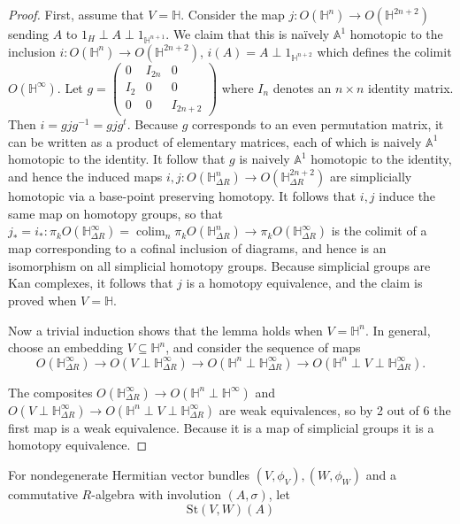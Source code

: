 \documentclass[edeposit,fullpage]{uiucthesis2009}
\newcommand{\mbb}{\mathbb}
\newcommand{\St}{\mathrm{St}}
\DeclareMathOperator*{\colim}{colim}
\theoremstyle{plain}
\numberwithin{lemma}{section}
\theoremstyle{definition}
\begin{document}
\begin{proof}
First, assume that $V = \mbb H$. Consider the map $j : O(\mbb H^n)
\rightarrow O(\mbb H^{2n+2})$ sending $A$ to $1_H \perp A \perp
1_{\mbb H^{n+1}}$. We claim that this is na\"ively $\mbb A^1$ homotopic
to the inclusion $i : O(\mbb H^n) \rightarrow O(\mbb H^{2n+2})$, $i(A)
= A \perp 1_{\mbb H^{n+2}}$ which defines the colimit $O(\mbb
H^\infty)$. Let $g = \begin{pmatrix}
0 & I_{2n} & 0 \\
I_2 & 0 & 0 \\
0 & 0 & I_{2n+2}
\end{pmatrix}$ where $I_n$ denotes an $n \times n$ identity
matrix. Then $i = gjg^{-1} = gjg^t$. Because $g$ corresponds to an
even permutation matrix, it can be written as a product of elementary
matrices, each of which is naively $\mbb A^1$ homotopic to the
identity. It follow that $g$ is naively $\mbb A^1$ homotopic to the
identity, and hence the induced maps $i,j : O(\mbb H^n_{\Delta R})
\rightarrow O(\mbb H^{2n+2}_{\Delta R})$ are simplicially homotopic
via a base-point preserving homotopy. It follows that $i,j$ induce the
same map on homotopy groups, so that $j_* = i_*: \pi_kO(\mbb
H^\infty_{\Delta R}) = \colim_n \pi_k O(\mbb H^n_{\Delta R})
\rightarrow \pi_k O(\mbb H^\infty_{\Delta R})$ is the colimit of a map
corresponding to a cofinal inclusion of diagrams, and hence is an
isomorphism on all simplicial homotopy groups. Because simplicial
groups are Kan complexes, it follows that $j$ is a homotopy
equivalence, and the claim is proved when $V = \mbb H$.

Now a trivial induction shows that the lemma holds when $V = \mbb
H^n$. In general, choose an embedding $V \subseteq \mbb H^n$, and
consider the sequence of maps
\[
O(\mbb H^\infty_{\Delta R}) \rightarrow O(V \perp \mbb
H^\infty_{\Delta R}) \rightarrow O(\mbb H^n \perp \mbb H_{\Delta R}^\infty)
\rightarrow O(\mbb H^n \perp V \perp \mbb H^\infty_{\Delta R}).
\]

The composites $O(\mbb H^\infty_{\Delta R}) \rightarrow O(\mbb H^n
\perp \mbb H^\infty)$ and $O(V \perp \mbb
H^\infty_{\Delta R}) \rightarrow O(\mbb H^n \perp V \perp \mbb
H^\infty_{\Delta R})$ are weak equivalences, so by 2 out of 6 the
first map is a weak equivalence. Because it is a map of simplicial
groups it is a homotopy equivalence. 
 
\end{proof}

For nondegenerate Hermitian vector bundles $(V,\phi_V), (W,\phi_W)$ and a commutative
$R$-algebra with involution $(A,\sigma)$, let
\[
\St(V,W)(A)
\]
\end{document}
